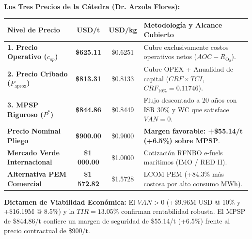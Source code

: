 \documentclass[10pt,landscape]{article}
\begin{document}
\vspace{2.5pt}

\noindent
\begin{minipage}[t]{0.48\textwidth}
  \begin{tcolorbox}[colback=white,colframe=navyblue!60,arc=1.5mm,boxrule=0.7pt,top=2.5pt,bottom=2.5pt,left=4pt,right=4pt]
    \textbf{\fontsize{7.2pt}{8.5pt}\selectfont \color{navyblue}Los Tres Precios de la Cátedra (Dr. Arzola Flores):}\par\vspace{1pt}
    \fontsize{4.8pt}{5.8pt}\selectfont
    \renewcommand{\arraystretch}{1.10}
    \begin{tabularx}{\linewidth}{p{2.2cm} c c X}
      \toprule
      \rowcolor{tableheader}
      \textbf{\color{white}Nivel de Precio} & \textbf{\color{white}USD/t} & \textbf{\color{white}USD/kg} & \textbf{\color{white}Metodología y Alcance Cubierto} \\
      \midrule
      \rowcolor{roweven}
      \textbf{1. Precio Operativo ($c_{op}$)} & \textbf{\$625.11} & \$0.6251 & Cubre exclusivamente costos operativos netos ($AOC - R_{\text{O}_2}$). \\
      \rowcolor{rowodd}
      \textbf{2. Precio Cribado ($P_{\text{aprox}}$)} & \textbf{\$813.31} & \$0.8133 & Cubre OPEX + Anualidad de capital ($CRF \times TCI$, $CRF_{10\%}=0.11746$). \\
      \rowcolor{roweven}
      \textbf{3. MPSP Riguroso ($P^*$)} & \textbf{\$844.86} & \$0.8449 & Flujo descontado a 20 años con ISR 30\% y WC que satisface $VAN = 0$. \\
      \midrule
      \rowcolor{badgeblue}
      \textbf{Precio Nominal Pliego} & \textbf{\$900.00} & \$0.9000 & \textbf{Margen favorable: +\$55.14/t (+6.5\%) sobre MPSP}. \\
      \rowcolor{badgegreen}
      \textbf{Mercado Verde Internacional} & \textbf{\$1\,000.00} & \$1.0000 & Cotización RFNBO e-fuels marítimos (IMO / RED II). \\
      \rowcolor{badgered}
      \textbf{Alternativa PEM Comercial} & \textbf{\$1\,572.82} & \$1.5728 & LCOM PEM (+84.3\% más costosa por alto consumo MWh). \\
      \bottomrule
    \end{tabularx}
  \end{tcolorbox}
  \vspace{1pt}
  \begin{tcolorbox}[colback=badgegreen,colframe=emeraldgreen!80!black,arc=1.2mm,boxrule=0.6pt,top=2pt,bottom=2pt,left=4pt,right=4pt]
    \fontsize{4.8pt}{6.0pt}\selectfont
    \textbf{\color{emeraldgreen}Dictamen de Viabilidad Económica:}
    El $VAN > 0$ (+\$9.96M USD @ 10\% y +\$16.19M @ 8.5\%) y la $TIR = 13.05\%$ confirman rentabilidad robusta. El MPSP de \$844.86/t confiere un margen de seguridad de \$55.14/t (+6.5\%) frente al precio contractual de \$900/t.
  \end{tcolorbox}
\end{minipage}
\end{document}
